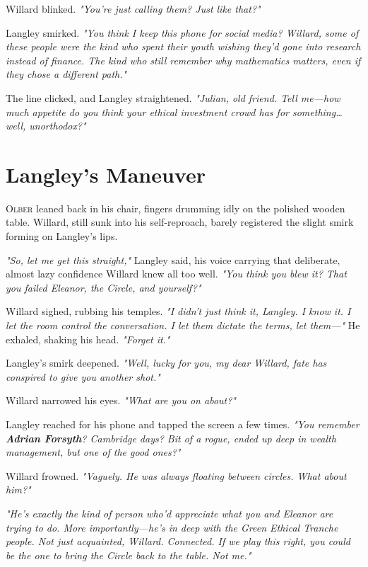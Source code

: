 Willard blinked. \textit{"You’re just calling them? Just like that?"}

Langley smirked. \textit{"You think I keep this phone for social media? Willard, some of these people were the kind who spent their youth wishing they’d gone into research instead of finance. The kind who still remember \textit{why} mathematics matters, even if they chose a different path."} 

The line clicked, and Langley straightened. \textit{"Julian, old friend. Tell me—how much appetite do you think your ethical investment crowd has for something… well, unorthodox?"}



\section*{Langley’s Maneuver}

\lettrine{O}{lber} leaned back in his chair, fingers drumming idly on the polished wooden table. Willard, still sunk into his self-reproach, barely registered the slight smirk forming on Langley’s lips. 

\textit{"So, let me get this straight,"} Langley said, his voice carrying that deliberate, almost lazy confidence Willard knew all too well. \textit{"You think you blew it? That you failed Eleanor, the Circle, and yourself?"}

Willard sighed, rubbing his temples. \textit{"I didn’t just think it, Langley. I know it. I let the room control the conversation. I let them dictate the terms, let them—"} He exhaled, shaking his head. \textit{"Forget it."}

Langley’s smirk deepened. \textit{"Well, lucky for you, my dear Willard, fate has conspired to give you another shot."}

Willard narrowed his eyes. \textit{"What are you on about?"}

Langley reached for his phone and tapped the screen a few times. \textit{"You remember \textbf{Adrian Forsyth}? Cambridge days? Bit of a rogue, ended up deep in wealth management, but one of the good ones?"}

Willard frowned. \textit{"Vaguely. He was always floating between circles. What about him?"}

\textit{"He’s exactly the kind of person who’d appreciate what you and Eleanor are trying to do. More importantly—he’s in deep with the Green Ethical Tranche people. Not just acquainted, Willard. Connected. If we play this right, you could be the one to bring the Circle back to the table. Not me."}

